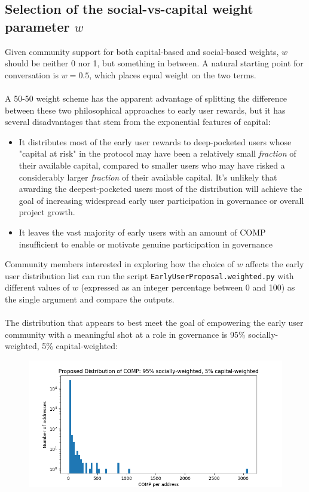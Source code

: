 \documentclass[12pt]{article}
\begin{document}
\subsection{Selection of the social-vs-capital weight parameter $w$}

Given community support for both capital-based and social-based weights,
$w$ should be neither 0 nor 1, but something in between. A natural starting
point for conversation is $w = 0.5$, which places equal weight on the two terms.
\\\\
A 50-50 weight scheme has the apparent advantage of splitting the difference
between these two philosophical approaches to early user rewards, but it has
several disadvantages that stem from the exponential features of capital:
\begin{itemize}
  \item{It distributes most of the early user rewards to deep-pocketed
        users whose "capital at risk" in the protocol may have been a
        relatively small {\em fraction} of their available capital,
        compared to smaller users who may have risked a considerably larger
        {\em fraction} of their available capital. It's unlikely that
        awarding the deepest-pocketed users most of the distribution will
        achieve the goal of increasing widespread early user participation
        in governance or overall project growth.}
  \item{It leaves the vast majority of early users with an amount of COMP
        insufficient to enable or motivate genuine participation in governance}
\end{itemize}

Community members interested in exploring how the choice of $w$ affects the
early user distribution list can run the script \texttt{EarlyUserProposal.weighted.py}
with different values of $w$ (expressed as an integer percentage between 0 and 100)
as the single argument and compare the outputs.
\\\\
The distribution that appears to best meet the goal of empowering the
early user community with a meaningful shot at a role in governance is
95\% socially-weighted, 5\% capital-weighted:

\begin{figure}
 \centering
 \includegraphics[width=5in]{proposals/Proposal.png}
\end{figure}
\end{document}
